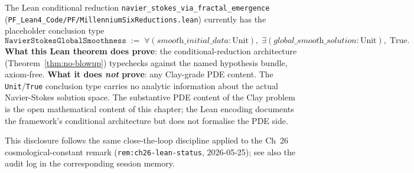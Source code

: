 \begin{remark}\label{rem:ns-lean-status}
The Lean conditional reduction \texttt{navier\_stokes\_via\_fractal\_emergence} (\texttt{PF\_Lean4\_Code/PF/MillenniumSixReductions.lean}) currently has the placeholder conclusion type
\[
\texttt{NavierStokesGlobalSmoothness} \;:=\; \forall (\textit{smooth\_initial\_data} : \text{Unit}),\; \exists (\textit{global\_smooth\_solution} : \text{Unit}),\; \text{True}.
\]
\textbf{What this Lean theorem does prove}: the conditional-reduction architecture (Theorem~\ref{thm:no-blowup}) typechecks against the named hypothesis bundle, axiom-free. \textbf{What it does \emph{not} prove}: any Clay-grade PDE content. The \texttt{Unit}/\texttt{True} conclusion type carries no analytic information about the actual Navier-Stokes solution space. The substantive PDE content of the Clay problem is the open mathematical content of this chapter; the Lean encoding documents the framework's conditional architecture but does not formalise the PDE side.

This disclosure follows the same close-the-loop discipline applied to the Ch~26 cosmological-constant remark (\texttt{rem:ch26-lean-status}, 2026-05-25); see also the audit log in the corresponding session memory.
\end{remark}

